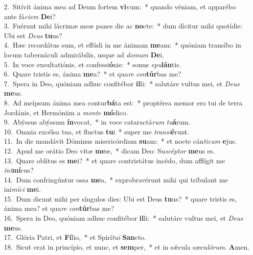{2.~}Sitívit ánima mea ad Deum fortem \textbf{vi}vum:~* quando véniam, et apparébo ante fá\textit{ci}\textit{em} \textbf{De}i?\\
{3.~}Fuérunt mihi lácrimæ meæ panes die ac \textbf{no}cte:~* dum dícitur mihi quotídie: Ubi est \textit{De}\textit{us} \textbf{tu}us?\\
{4.~}Hæc recordátus sum, et effúdi in me ánimam \textbf{me}am:~* quóniam transíbo in locum tabernáculi admirábilis, usque ad \textit{do}\textit{mum} \textbf{De}i.\\
{5.~}In voce exsultatiónis, et confessi\textbf{ó}nis:~* sonus \textit{e}\textit{pu}\textbf{lán}tis.\\
{6.~}Quare tristis es, ánima \textbf{me}a?~* et qua\textit{re} \textit{con}\textbf{túr}bas me?\\
{7.~}Spera in Deo, quóniam adhuc confitébor \textbf{il}li:~* salutáre vultus mei, et \textit{De}\textit{us} \textbf{me}us.\\
{8.~}Ad meípsum ánima mea contur\textbf{bá}ta est:~* proptérea memor ero tui de terra Jordánis, et Hermóniim a \textit{mon}\textit{te} \textbf{mó}dico.\\
{9.~}Abýssus abýssum \textbf{ín}vocat,~* in voce cataractá\textit{rum} \textit{tu}\textbf{á}rum.\\
{10.~}Omnia excélsa tua, et fluctus \textbf{tu}i~* super me \textit{tran}\textit{si}\textbf{é}runt.\\
{11.~}In die mandávit Dóminus misericórdiam \textbf{su}am:~* et nocte cán\textit{ti}\textit{cum} \textbf{e}jus.\\
{12.~}Apud me orátio Deo vitæ \textbf{me}æ,~* dicam Deo: Su\textit{scép}\textit{tor} \textbf{me}us es.\\
{13.~}Quare oblítus es \textbf{me}i?~* et quare contristátus incédo, dum afflígit me \textit{i}\textit{ni}\textbf{mí}cus?\\
{14.~}Dum confringúntur ossa \textbf{me}a,~* exprobravérunt mihi qui tríbulant me ini\textit{mí}\textit{ci} \textbf{me}i.\\
{15.~}Dum dicunt mihi per síngulos dies: Ubi est Deus \textbf{tu}us?~* quare tristis es, ánima mea? et qua\textit{re} \textit{con}\textbf{túr}bas me?\\
{16.~}Spera in Deo, quóniam adhuc confitébor \textbf{il}li:~* salutáre vultus mei, et \textit{De}\textit{us} \textbf{me}us.\\
{17.~}Glória Patri, et \textbf{Fí}lio,~* et Spirí\textit{tu}\textit{i} \textbf{San}cto.\\
{18.~}Sicut erat in princípio, et nunc, et \textbf{sem}per,~* et in sǽcula sæcu\textit{ló}\textit{rum}. \textbf{A}men.\\
